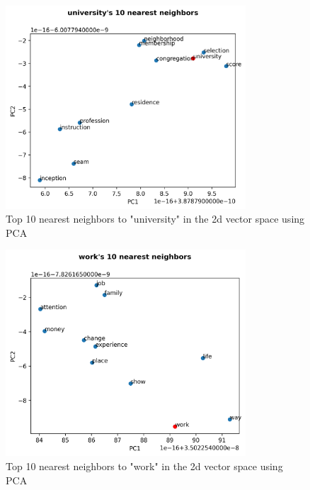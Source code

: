 \documentclass[12pt,letterpaper]{article}
\begin{document}
\begin{figure}[H]
\begin{center}
  \includegraphics[width=0.8\textwidth]{../graphs/university_neighbors.png}
\end{center}
\caption{Top 10 nearest neighbors to "university" in the 2d vector space using PCA}
\end{figure}

\begin{figure}[H]
\begin{center}
  \includegraphics[width=0.8\textwidth]{../graphs/work_neighbors.png}
\end{center}
\caption{Top 10 nearest neighbors to "work" in the 2d vector space using PCA}
\end{figure}


\end{document}
